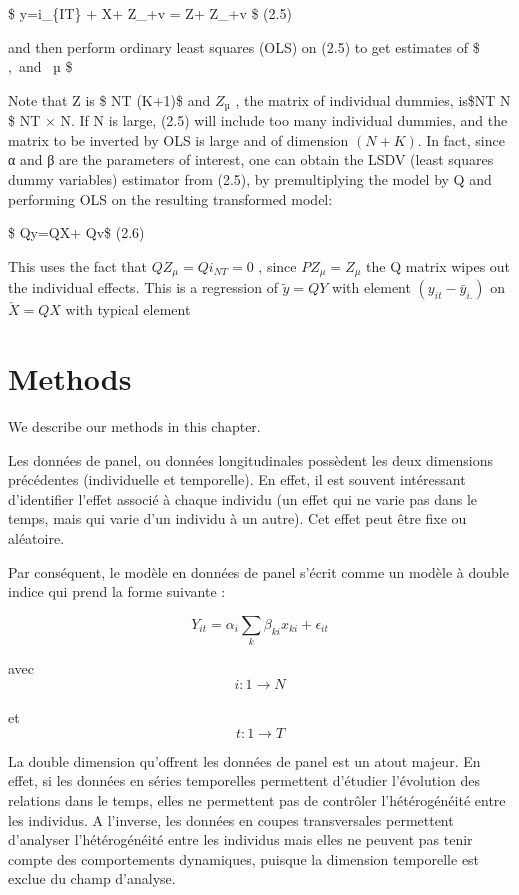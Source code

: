 \documentclass[
]{book}
\begin{document}
\$ y=\alpha i\_\{IT\} + X\beta + Z\_\mu \mu +v = Z\delta + Z\_\mu \mu +v \$ (2.5)

and then perform ordinary least squares (OLS) on (2.5) to get estimates of
\$ \alpha,\beta ~and ~µ \$

Note
that Z is \$ NT \times (K+1)\$ and \(Z_µ\) , the matrix of individual dummies, is\$NT \times N \$ NT × N. If N is large, (2.5) will include too many individual dummies, and the matrix to be inverted by OLS is large
and of dimension \((N + K)\). In fact, since α and β are the parameters of interest, one can obtain the LSDV (least squares dummy variables) estimator from (2.5), by premultiplying the model by Q and performing OLS on the resulting transformed model:

\$ Qy=QX\beta + Qv\$ (2.6)

This uses the fact that \(QZ_\mu =Qi_{NT}=0\) , since \(PZ_\mu =Z_\mu\) the Q matrix
wipes out the individual effects. This is a regression of \(\tilde y =QY\) with element \((y_{it} - \bar y _{i.} )\) on \(\check X=QX\) with typical element

\hypertarget{methods}{%
\chapter{Methods}\label{methods}}

We describe our methods in this chapter.

Les données de panel, ou données longitudinales possèdent les deux dimensions précédentes (individuelle et temporelle). En effet, il est souvent intéressant d'identifier l'effet associé à chaque individu (un effet qui ne varie pas dans le temps, mais qui varie d'un individu à un autre). Cet effet peut être fixe ou aléatoire.

Par conséquent, le modèle en données de panel s'écrit comme un modèle à double indice qui prend la forme suivante :

\[ Y_{it}= \alpha_i\sum_{k}\beta_{ki}x_{ki}+ \epsilon_{it} \]

avec
\[ i:1 \rightarrow N \]\\
et
\[ t:1 \rightarrow T \]

La double dimension qu'offrent les données de panel est un atout majeur. En effet, si les données en séries temporelles permettent d'étudier l'évolution des relations dans le temps, elles ne permettent pas de contrôler l'hétérogénéité entre les individus. A l'inverse, les données en coupes transversales permettent d'analyser l'hétérogénéité entre les individus mais elles ne peuvent pas tenir compte des comportements dynamiques, puisque la dimension temporelle est exclue du champ d'analyse.
\end{document}

